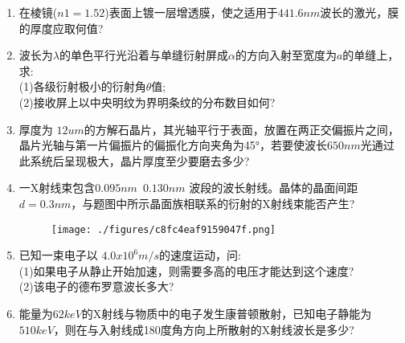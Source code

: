 \begin{enumerate}
\item 在棱镜($n1=1.52$)表面上镀一层增透膜，使之适用于$441.6nm $波长的激光，膜的厚度应取何值?
\item 波长为$\lambda$的单色平行光沿着与单缝衍射屏成$\alpha$的方向入射至宽度为$a$的单缝上，求:\\
(1)各级衍射极小的衍射角$\theta$值;\\
(2)接收屏上以中央明纹为界明条纹的分布数目如何?
\item 厚度为 $12um$的方解石晶片，其光轴平行于表面，放置在两正交偏振片之间，晶片光轴与第一片偏振片的偏振化方向夹角为45°，若要使波长$650nm$光通过此系统后呈现极大，晶片厚度至少要磨去多少?
\item 一X射线束包含$ 0.095nm$~$0.130nm$ 波段的波长射线。晶体的晶面间距$d=0.3nm$，与题图中所示晶面族相联系的衍射的X射线束能否产生?
\begin{figure}[ht]
\centering
\texttt{[image: ./figures/c8fc4eaf9159047f.png]}
\caption{} \label{fig_SD12_6}
\end{figure}
\item 已知一束电子以 $4.0x10^6m/s$的速度运动，问:\\
(1)如果电子从静止开始加速，则需要多高的电压才能达到这个速度?\\
(2)该电子的德布罗意波长多大?
\item 能量为$62 keV$的X射线与物质中的电子发生康普顿散射，已知电子静能为$510keV$，则在与入射线成180度角方向上所散射的X射线波长是多少?
\end{enumerate}